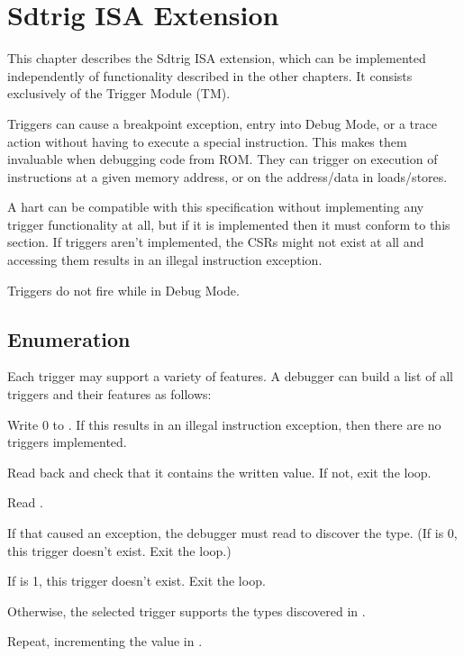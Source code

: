 \chapter{Sdtrig ISA Extension}
\label{sec:trigger}

This chapter describes the Sdtrig ISA extension, which can be implemented
independently of functionality described in the other chapters. It consists
exclusively of the Trigger Module (TM).

Triggers can cause a breakpoint exception, entry into Debug Mode, or a trace action
without having to execute a special instruction. This makes them invaluable
when debugging code from ROM. They can trigger on execution of instructions at
a given memory address, or on the address/data in loads/stores.

A hart can be compatible with this specification without implementing any
trigger functionality at all, but if it is implemented then it must conform to
this section. If triggers aren't implemented, the CSRs might not exist at all and
accessing them results in an illegal instruction exception.

Triggers do not fire while in Debug Mode.

\section{Enumeration}

\begin{steps}{Each trigger may support a variety of features. A debugger can
    build a list of all triggers and their features as follows:}
\item Write 0 to \RcsrTselect. If this results in an illegal instruction
    exception, then there are no triggers implemented.
\item Read back \RcsrTselect and check that it contains the written value. If not,
    exit the loop.
\item Read \RcsrTinfo.
\item If that caused an exception, the debugger must read \RcsrTdataOne to
    discover the type. (If \FcsrTdataOneType is 0, this trigger doesn't exist. Exit the
    loop.)
\item If \FcsrTinfoInfo is 1, this trigger doesn't exist. Exit the loop.
\item Otherwise, the selected trigger supports the types discovered in \FcsrTinfoInfo.
\item Repeat, incrementing the value in \RcsrTselect.
\end{steps}

